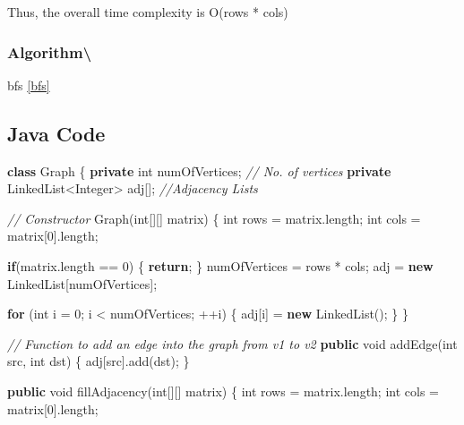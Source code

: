 \documentclass[]{book}
\newenvironment{Shaded}{\begin{snugshade}}{\end{snugshade}}
\newcommand{\BuiltInTok}[1]{#1}
\newcommand{\CommentTok}[1]{\textcolor[rgb]{0.56,0.35,0.01}{\textit{#1}}}
\newcommand{\DataTypeTok}[1]{\textcolor[rgb]{0.13,0.29,0.53}{#1}}
\newcommand{\DecValTok}[1]{\textcolor[rgb]{0.00,0.00,0.81}{#1}}
\newcommand{\FunctionTok}[1]{\textcolor[rgb]{0.00,0.00,0.00}{#1}}
\newcommand{\KeywordTok}[1]{\textcolor[rgb]{0.13,0.29,0.53}{\textbf{#1}}}
\newcommand{\NormalTok}[1]{#1}
\begin{document}
Thus, the overall time complexity is O(rows * cols)

\hypertarget{algorithm-105}{%
\subsubsection{Algorithm\textbackslash{}}\label{algorithm-105}}

bfs \ref{bfs}

\hypertarget{java-code-60}{%
\subsection{Java Code}\label{java-code-60}}

\begin{Shaded}
\begin{Highlighting}[]
\KeywordTok{class}\NormalTok{ Graph \{}
    \KeywordTok{private} \DataTypeTok{int}\NormalTok{ numOfVertices; }\CommentTok{// No. of vertices}
    \KeywordTok{private} \BuiltInTok{LinkedList}\NormalTok{<}\BuiltInTok{Integer}\NormalTok{> adj[]; }\CommentTok{//Adjacency Lists}

    \CommentTok{// Constructor}
    \FunctionTok{Graph}\NormalTok{(}\DataTypeTok{int}\NormalTok{[][] matrix) \{}
        \DataTypeTok{int}\NormalTok{ rows = matrix.}\FunctionTok{length}\NormalTok{;}
        \DataTypeTok{int}\NormalTok{ cols = matrix[}\DecValTok{0}\NormalTok{].}\FunctionTok{length}\NormalTok{;}

        \KeywordTok{if}\NormalTok{(matrix.}\FunctionTok{length}\NormalTok{ == }\DecValTok{0}\NormalTok{) \{}
            \KeywordTok{return}\NormalTok{;}
\NormalTok{        \}}
\NormalTok{        numOfVertices = rows * cols;}
\NormalTok{        adj = }\KeywordTok{new} \BuiltInTok{LinkedList}\NormalTok{[numOfVertices];}

        \KeywordTok{for}\NormalTok{ (}\DataTypeTok{int}\NormalTok{ i = }\DecValTok{0}\NormalTok{; i < numOfVertices; ++i) \{}
\NormalTok{            adj[i] = }\KeywordTok{new} \BuiltInTok{LinkedList}\NormalTok{();}
\NormalTok{        \}}
\NormalTok{    \}}

    \CommentTok{// Function to add an edge into the graph from v1 to v2}
    \KeywordTok{public} \DataTypeTok{void} \FunctionTok{addEdge}\NormalTok{(}\DataTypeTok{int}\NormalTok{ src, }\DataTypeTok{int}\NormalTok{ dst) \{}
\NormalTok{        adj[src].}\FunctionTok{add}\NormalTok{(dst);}
\NormalTok{    \}}

    \KeywordTok{public} \DataTypeTok{void} \FunctionTok{fillAdjacency}\NormalTok{(}\DataTypeTok{int}\NormalTok{[][] matrix) \{}
        \DataTypeTok{int}\NormalTok{ rows = matrix.}\FunctionTok{length}\NormalTok{;}
        \DataTypeTok{int}\NormalTok{ cols = matrix[}\DecValTok{0}\NormalTok{].}\FunctionTok{length}\NormalTok{;}


\end{Highlighting}
\end{Shaded}
\end{document}

